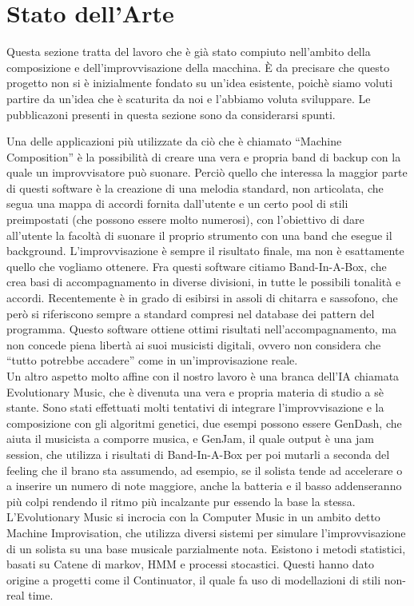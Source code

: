 \section{Stato dell'Arte}
Questa sezione tratta del lavoro che è già stato compiuto nell'ambito della composizione e dell'improvvisazione della macchina.
È da precisare che questo progetto non si è inizialmente fondato su un'idea esistente, poichè siamo voluti partire da un'idea che è scaturita da noi e l'abbiamo voluta sviluppare.
Le pubblicazoni presenti in questa sezione sono da considerarsi spunti.
\newline

Una delle applicazioni più utilizzate da ciò che è chiamato ``Machine Composition'' è la possibilità di creare una vera e propria band di backup con la quale un improvvisatore può suonare.
Perciò quello che interessa la maggior parte di questi software è la creazione di una melodia standard, non articolata, che segua una mappa di accordi fornita dall'utente e un certo pool di stili preimpostati (che possono essere molto numerosi), con l'obiettivo di dare all'utente la facoltà di suonare il proprio strumento con una band che esegue il background.
L'improvvisazione è sempre il risultato finale, ma non è esattamente quello che vogliamo ottenere.
Fra questi software citiamo Band-In-A-Box\cite{biab}, che crea basi di accompagnamento in diverse divisioni, in tutte le possibili tonalità e accordi.
Recentemente è in grado di esibirsi in assoli di chitarra e sassofono, che però si riferiscono sempre a standard compresi nel database dei pattern del programma.
Questo software ottiene ottimi risultati nell'accompagnamento, ma non concede piena libertà ai suoi musicisti digitali, ovvero non considera che ``tutto potrebbe accadere'' come in un'improvisazione reale.
\\
Un altro aspetto molto affine con il nostro lavoro è una branca dell'IA chiamata Evolutionary Music, che è divenuta una vera e propria materia di studio a sè stante\cite{evomus}.
Sono stati effettuati molti tentativi di integrare l'improvvisazione e la composizione con gli algoritmi genetici, due esempi possono essere GenDash\cite{gendash}, che aiuta il musicista a comporre  musica, e GenJam\cite{genjam}, il quale output è una jam session, che utilizza i risultati di Band-In-A-Box per poi mutarli a seconda del feeling che il brano sta assumendo, ad esempio, se il solista tende ad accelerare o a inserire un numero di note maggiore, anche la batteria e il basso addenseranno più colpi rendendo il ritmo più incalzante pur essendo la base la stessa.
\\
L'Evolutionary Music si incrocia con la Computer Music in un ambito detto Machine Improvisation, che utilizza diversi sistemi per simulare l'improvvisazione di un solista su una base musicale parzialmente nota.
Esistono i metodi statistici, basati su Catene di markov, HMM e processi stocastici\cite{hmm}.
Questi hanno dato origine a progetti come il Continuator\cite{cont}, il quale fa uso di modellazioni di stili non-real time\cite{dubnov}.
\newline

